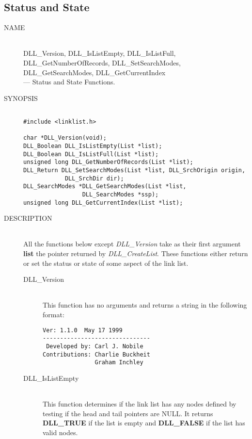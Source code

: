 \documentclass[10pt,letterpaper,titlepage]{article}
\begin{document}
\subsection{Status and State}
\begin{description}
\item[NAME]\quad\\
DLL\_Version, DLL\_IsListEmpty, DLL\_IsListFull,\\
DLL\_GetNumberOfRecords, DLL\_SetSearchModes,\\
DLL\_GetSearchModes, DLL\_GetCurrentIndex\\
 --- Status and State Functions.

\item[SYNOPSIS]
\small
\begin{verbatim}

#include <linklist.h>

char *DLL_Version(void);
DLL_Boolean DLL_IsListEmpty(List *list);
DLL_Boolean DLL_IsListFull(List *list);
unsigned long DLL_GetNumberOfRecords(List *list);
DLL_Return DLL_SetSearchModes(List *list, DLL_SrchOrigin origin,
            DLL_SrchDir dir);
DLL_SearchModes *DLL_GetSearchModes(List *list,
                 DLL_SearchModes *ssp);
unsigned long DLL_GetCurrentIndex(List *list);
\end{verbatim}
\normalsize

\item[DESCRIPTION]\quad\\
All the functions below except \emph{DLL\_Version} take as their first argument \textbf{list} the pointer returned by \emph{DLL\_CreateList}.  These functions either return or set the status or state of some aspect of the link list.

 \begin{description}
 \item[DLL\_Version]\quad\\
 This function has no arguments and returns a string in the following format:
 \begin{verbatim}
Ver: 1.1.0  May 17 1999
-------------------------------
 Developed by: Carl J. Nobile
Contributions: Charlie Buckheit
               Graham Inchley
 \end{verbatim}
 \vspace{-16pt}
 \item[DLL\_IsListEmpty]\quad\\
 This function determines if the link list has any nodes defined by testing if the head and tail pointers are NULL.  It returns \textbf{DLL\_TRUE} if the list is empty and \textbf{DLL\_FALSE} if the list has valid nodes.


\end{description}
\end{description}
\end{document}
